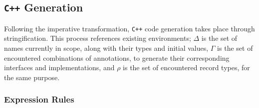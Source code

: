 \documentclass{article}
\begin{document}
    \subsection{\texttt{C++} Generation}

    Following the imperative transformation, \texttt{C++} code generation takes place through
    stringification. This process references existing environments; $\Delta$ is the set of names
    currently in scope, along with their types and initial values, $\Gamma$ is the set of
    encountered combinations of annotations, to generate their corresponding interfaces and
    implementations, and $\rho$ is the set of encountered record types, for the same purpose.

    \subsubsection{Expression Rules}
%
\end{document}
